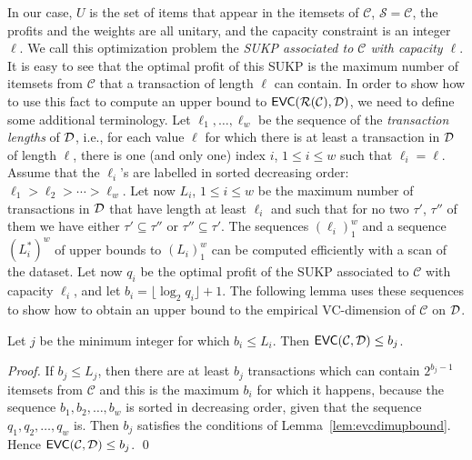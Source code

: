 In our case, $U$ is the set of items that appear in the itemsets of
$\mathcal{C}$, $\mathcal{S}=\mathcal{C}$, the profits and the weights are all
unitary, and the capacity constraint is an integer $\ell$. We call this
optimization problem the \emph{SUKP associated to $\mathcal{C}$ with capacity
$\ell$}.
It is easy to see %
that the optimal profit of this SUKP is the maximum number
of itemsets from $\mathcal{C}$ that a transaction of length $\ell$ can contain.  %
In order to show how to use this fact to compute an upper bound to
$\mathsf{EVC}(\mathcal{R}(\mathcal{C}),{\cal D})$, we need to define some additional terminology. Let
$\ell_1,\dotsc,\ell_w$ be the sequence of the
\emph{transaction lengths} of ${\cal D}$, i.e., for each value $\ell$
for which there is at least a transaction in ${\cal D}$ of length $\ell$, there is
one (and only one) index $i$, $1\le i\le w$ such that $\ell_i=\ell$. Assume that
the $\ell_i$'s are labelled in sorted decreasing order:
$\ell_1>\ell_2>\dotsb>\ell_w$. Let now $L_i$, $1\le i\le w$ be the maximum number of
transactions in ${\cal D}$ that have length at least $\ell_i$ and such that
for no two $\tau'$, $\tau''$ of them we have either $\tau'\subseteq\tau''$ or
$\tau''\subseteq\tau'$. The sequences $(\ell_i)_1^w$ and a sequence $(L_i^*)^w$
of upper bounds to $(L_i)_1^w$ can be computed efficiently with a scan of the
dataset. Let now $q_i$ be the optimal profit of the SUKP associated to
$\mathcal{C}$ with capacity $\ell_i$, and let $b_i=\lfloor \log_2q_i\rfloor +1$.
The following lemma uses these sequences to show how to obtain an upper bound to
the empirical VC-dimension of $\mathcal{C}$ on ${\cal D}$.

\begin{lemma}\label{lem:sukpevc}
  Let $j$ be the minimum integer for which $b_i\le L_i$. Then
  $\mathsf{EVC}(\mathcal{C},{\cal D})\le b_j$. %
\end{lemma}
\ifarxiv
\begin{proof}
  If $b_j\le L_j$, then there are at least $b_j$ transactions which can contain
  $2^{b_j-1}$ itemsets from $\mathcal{C}$ and this is the maximum $b_i$ for
  which it happens, because the sequence $b_1,b_2,\dotsc,b_w$ is sorted in
  decreasing order, given that the sequence $q_1,q_2,\dotsc,q_w$ is. Then $b_j$
  satisfies the conditions of Lemma~\ref{lem:evcdimupbound}. Hence
  $\mathsf{EVC}(\mathcal{C},{\cal D})\le b_j$.
  \qed
\end{proof}
\fi

